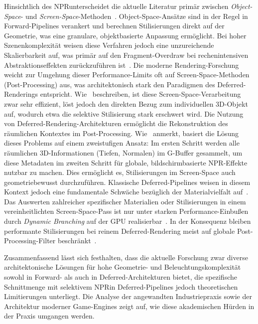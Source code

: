 Hinsichtlich des \ac{NPR}unterscheidet die aktuelle Literatur primär zwischen
\textit{Object-Space}- und
\textit{Screen-Space}-Methoden~\cite[S.~148]{magdicsPostprocessingNPREffects2013}.
Object-Space-Ansätze sind in der Regel in Forward-Pipelines verankert und berechnen Stilisierungen direkt auf
der Geometrie, was eine granulare, objektbasierte Anpassung ermöglicht.
Bei hoher Szenenkomplexität weisen diese Verfahren jedoch eine unzureichende Skalierbarkeit auf, was primär auf den
Fragment-Overdraw bei rechenintensiven Abstraktionseffekten zurückzuführen
ist~\cite[S.~1]{fatahalianReducingShadingGPUs2010}.
Die moderne Rendering-Forschung weicht zur Umgehung dieser Performance-Limits oft auf Screen-Space-Methoden
(Post-Processing) aus, was architektonisch stark den Paradigmen des Deferred-Renderings entspricht.
Wie~\textcite[S.~148]{magdicsPostprocessingNPREffects2013} beschreiben, ist diese Screen-Space-Verarbeitung zwar
sehr effizient, löst jedoch den direkten Bezug zum individuellen 3D-Objekt auf, wodurch etwa die selektive Stilisierung
stark erschwert wird.
Die Nutzung von Deferred-Rendering-Architekturen ermöglicht die Rekonstruktion des räumlichen Kontextes im
Post-Processing.
Wie~\textcite[Abschn.~3.2]{Thaler2011DeferredRendering} anmerkt, basiert die Lösung dieses Problems auf einem
zweistufigen Ansatz: Im ersten Schritt werden alle räumlichen 3D-Informationen (Tiefen, Normalen) im \ac{G-Buffer} gesammelt,
um diese Metadaten im zweiten Schritt für globale, bildschirmbasierte \ac{NPR}-Effekte nutzbar zu machen.
Dies ermöglicht es, Stilisierungen im Screen-Space auch geometriebewusst durchzuführen.
Klassische Deferred-Pipelines weisen in diesem Kontext jedoch eine fundamentale Schwäche bezüglich der Materialvielfalt
auf~\cite[S.~1]{haradaForwardBringingDeferred2012}.
Das Auswerten zahlreicher spezifischer Materialien oder Stilisierungen in einem vereinheitlichten Screen-Space-Pass
ist nur unter starken Performance-Einbußen durch \textit{Dynamic Branching} auf der \ac{GPU}
realisierbar~\cite[Abschn.~2.6]{Thaler2011DeferredRendering}.
In der Konsequenz bleiben performante Stilisierungen bei reinem Deferred-Rendering meist auf globale
Post-Processing-Filter beschränkt~\cite[S.~148]{magdicsPostprocessingNPREffects2013}.

Zusammenfassend lässt sich festhalten, dass die aktuelle Forschung zwar diverse architektonische Lösungen für hohe
Geometrie- und Beleuchtungskomplexität sowohl in Forward- als auch in Deferred-Architekturen bietet, die spezifische
Schnittmenge mit selektivem \ac{NPR}in Deferred-Pipelines jedoch theoretischen Limitierungen
unterliegt.
Die Analyse der angewandten Industriepraxis sowie der Architektur moderner Game-Engines zeigt auf, wie diese
akademischen Hürden in der Praxis umgangen werden.


